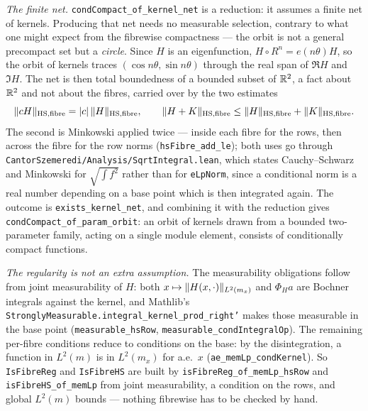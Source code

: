 \begin{remark}
  \smallskip
  \emph{The finite net.}  \texttt{condCompact\_of\_kernel\_net} is a reduction: it assumes a
  finite net of kernels.  Producing that net needs no measurable selection, contrary to what
  one might expect from the fibrewise compactness --- the orbit is not a general precompact
  set but a \emph{circle}.  Since $H$ is an eigenfunction, $H \circ R^n = e(n\theta) H$, so
  the orbit of kernels traces $(\cos n\theta, \sin n\theta)$ through the real span of
  $\Re H$ and $\Im H$.  The net is then total boundedness of a bounded subset of $\mathbb{R}^2$,
  a fact about $\mathbb{R}^2$ and not about the fibres, carried over by the two estimates
  \[
    \lVert c H \rVert_{\mathrm{HS},\text{fibre}} = \lvert c \rvert\,\lVert H \rVert_{\mathrm{HS},\text{fibre}},
    \qquad
    \lVert H+K \rVert_{\mathrm{HS},\text{fibre}}
      \leq \lVert H \rVert_{\mathrm{HS},\text{fibre}} + \lVert K \rVert_{\mathrm{HS},\text{fibre}} .
  \]
  The second is Minkowski applied twice --- inside each fibre for the rows, then across the
  fibre for the row norms (\texttt{hsFibre\_add\_le}); both uses go through
  \texttt{CantorSzemeredi/Analysis/SqrtIntegral.lean}, which states Cauchy--Schwarz and
  Minkowski for $\sqrt{\int f^2}$ rather than for \texttt{eLpNorm}, since a conditional norm
  is a real number depending on a base point which is then integrated again.  The outcome is
  \texttt{exists\_kernel\_net}, and combining it with the reduction gives
  \texttt{condCompact\_of\_param\_orbit}: an orbit of kernels drawn from a bounded
  two-parameter family, acting on a single module element, consists of conditionally compact
  functions.

  \smallskip
  \emph{The regularity is not an extra assumption.}  The measurability obligations follow
  from joint measurability of $H$: both $x \mapsto \lVert H(x,\cdot) \rVert_{L^2(m_x)}$ and
  $\Phi_H a$ are Bochner integrals against the kernel, and Mathlib's
  \texttt{StronglyMeasurable.integral\_kernel\_prod\_right'} makes those measurable in the
  base point (\texttt{measurable\_hsRow}, \texttt{measurable\_condIntegralOp}).  The
  remaining per-fibre conditions reduce to conditions on the base: by the disintegration, a
  function in $L^2(m)$ is in $L^2(m_x)$ for a.e.\ $x$ (\texttt{ae\_memLp\_condKernel}).  So
  \texttt{IsFibreReg} and \texttt{IsFibreHS} are built by
  \texttt{isFibreReg\_of\_memLp\_hsRow} and \texttt{isFibreHS\_of\_memLp} from joint
  measurability, a condition on the rows, and global $L^2(m)$ bounds --- nothing fibrewise
  has to be checked by hand.


\end{remark}

